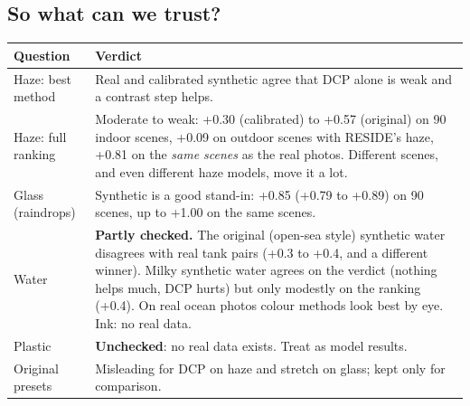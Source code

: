 \documentclass[10pt,a4paper]{article}
\begin{document}
\subsection{So what can we trust?}
\begin{center}\small\begin{tabular}{p{4.2cm}p{11.3cm}}\toprule
Question & Verdict\\\midrule
Haze: best method & Real and calibrated synthetic agree that DCP alone is weak and a contrast step helps.\\
Haze: full ranking & Moderate to weak: +0.30 (calibrated) to +0.57 (original) on 90 indoor scenes, +0.09 on outdoor scenes with RESIDE's haze, +0.81 on the \emph{same scenes} as the real photos. Different scenes, and even different haze models, move it a lot.\\
Glass (raindrops) & Synthetic is a good stand-in: +0.85 (+0.79 to +0.89) on 90 scenes, up to +1.00 on the same scenes.\\
Water & \textbf{Partly checked.} The original (open-sea style) synthetic water disagrees with real tank pairs (+0.3 to +0.4, and a different winner). Milky synthetic water agrees on the verdict (nothing helps much, DCP hurts) but only modestly on the ranking (+0.4). On real ocean photos colour methods look best by eye. Ink: no real data.\\
Plastic & \textbf{Unchecked}: no real data exists. Treat as model results.\\
Original presets & Misleading for DCP on haze and stretch on glass; kept only for comparison.\\\bottomrule
\end{tabular}\end{center}

\end{document}
